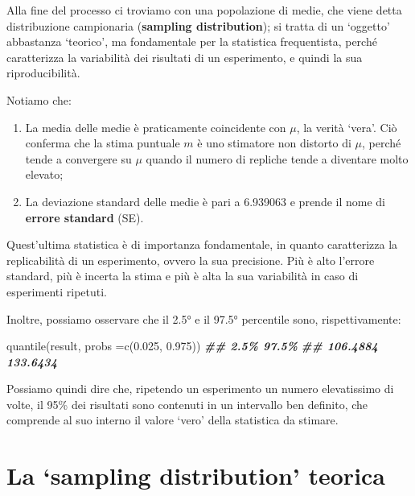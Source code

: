 \documentclass[
  12pt,
]{book}
\newenvironment{Shaded}{\begin{snugshade}}{\end{snugshade}}
\newcommand{\AttributeTok}[1]{\textcolor[rgb]{0.77,0.63,0.00}{#1}}
\newcommand{\DocumentationTok}[1]{\textcolor[rgb]{0.56,0.35,0.01}{\textbf{\textit{#1}}}}
\newcommand{\FloatTok}[1]{\textcolor[rgb]{0.00,0.00,0.81}{#1}}
\newcommand{\FunctionTok}[1]{\textcolor[rgb]{0.00,0.00,0.00}{#1}}
\newcommand{\NormalTok}[1]{#1}
\providecommand{\tightlist}{%
  \setlength{\itemsep}{0pt}\setlength{\parskip}{0pt}}
\begin{document}
\normalsize

Alla fine del processo ci troviamo con una popolazione di medie, che viene detta distribuzione campionaria (\textbf{sampling distribution}); si tratta di un `oggetto' abbastanza `teorico', ma fondamentale per la statistica frequentista, perché caratterizza la variabilità dei risultati di un esperimento, e quindi la sua riproducibilità.

Notiamo che:

\begin{enumerate}
\def\labelenumi{\arabic{enumi}.}
\tightlist
\item
  La media delle medie è praticamente coincidente con \(\mu\), la verità `vera'. Ciò conferma che la stima puntuale \(m\) è uno stimatore non distorto di \(\mu\), perché tende a convergere su \(\mu\) quando il numero di repliche tende a diventare molto elevato;
\item
  La deviazione standard delle medie è pari a 6.939063 e prende il nome di \textbf{errore standard} (SE).
\end{enumerate}

Quest'ultima statistica è di importanza fondamentale, in quanto caratterizza la replicabilità di un esperimento, ovvero la sua precisione. Più è alto l'errore standard, più è incerta la stima e più è alta la sua variabilità in caso di esperimenti ripetuti.

Inoltre, possiamo osservare che il 2.5° e il 97.5° percentile sono, rispettivamente:

\begin{Shaded}
\begin{Highlighting}[]
\FunctionTok{quantile}\NormalTok{(result, }\AttributeTok{probs =}\FunctionTok{c}\NormalTok{(}\FloatTok{0.025}\NormalTok{, }\FloatTok{0.975}\NormalTok{))}
\DocumentationTok{\#\#     2.5\%    97.5\% }
\DocumentationTok{\#\# 106.4884 133.6434}
\end{Highlighting}
\end{Shaded}

Possiamo quindi dire che, ripetendo un esperimento un numero elevatissimo di volte, il 95\% dei risultati sono contenuti in un intervallo ben definito, che comprende al suo interno il valore `vero' della statistica da stimare.

\hypertarget{la-sampling-distribution-teorica}{%
\section{La `sampling distribution' teorica}\label{la-sampling-distribution-teorica}}
\end{document}
